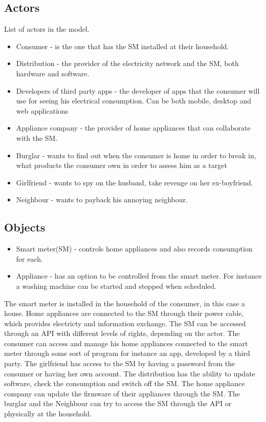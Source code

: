 \subsection{Actors}
List of actors in the model.
\begin{itemize}
\item Consumer - is the one that has the SM installed at their household.
\item Distribution - the provider of the electricity network and the SM, both hardware and software.
\item Developers of third party apps - the developer of apps that the consumer will use for seeing his electrical consumption. Can be both mobile, desktop and web applications
\item Appliance company - the provider of home appliances that can collaborate with the SM.
\item Burglar - wants to find out when the consumer is home in order to break in, what products the consumer own in order to assess him as a target
\item Girlfriend - wants to spy on the husband, take revenge on her ex-boyfriend.
\item Neighbour - wants to payback his annoying neighbour.
\end{itemize}

\subsection{Objects}
\begin{itemize}
\item Smart meter(SM) - controls home appliances and also records consumption for each.
\item Appliance - has an option to be controlled from the smart meter. For instance a washing machine can be started and stopped when scheduled.
\end{itemize}

The smart meter is installed in the household of the consumer, in this case a house.
Home appliances are connected to the SM through their power cable, which provides electricty and information exchange.
The SM can be accessed through an API with different levels of rights, depending on the actor.
The consumer can access and manage his home appliances connected to the smart meter through some sort of program for instance an app, developed by a third party.
The girlfriend has access to the SM by having a password from the consumer or having her own account.
The distribution has the ability to update software, check the consumption and switch off the SM.
The home appliance company can update the firmware of their appliances through the SM.
The burglar and the Neighbour can try to access the SM through the API or physically at the household.
